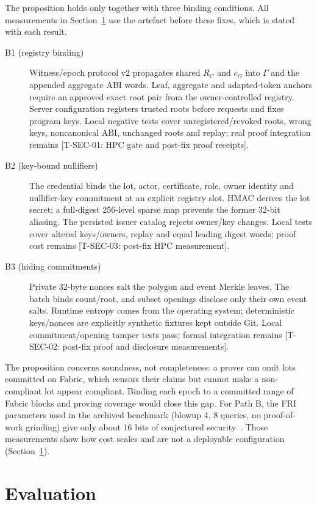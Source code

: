 \documentclass[runningheads]{llncs}
\newif\iffinal
\newcommand{\pending}[2]{\iffinal\errmessage{Unresolved pending result #1}\else{\color{red}[#1: #2]}\fi}
\newif\ifmarkrev
\newcommand{\rev}[1]{\ifmarkrev{\color{blue}#1}\else#1\fi}
\newcommand{\cG}{c_{G}}
\newcommand{\RC}{R_{C}}
\begin{document}
The proposition holds only together with three binding conditions. \rev{All measurements in Section~\ref{sec:eval} use the artefact before these fixes, which is stated with each result.}
\begin{description}
\item[B1 (registry binding)] Witness/epoch protocol v2 propagates shared $\RC$ and $\cG$ into $\Gamma$ and the appended aggregate ABI words. Leaf, aggregate and adapted-token anchors require an approved exact root pair from the owner-controlled registry. Server configuration registers trusted roots before requests and fixes program keys. Local negative tests cover unregistered/revoked roots, wrong keys, noncanonical ABI, unchanged roots and replay; real proof integration remains \pending{T-SEC-01}{HPC gate and post-fix proof receipts}.
\item[B2 (key-bound nullifiers)] The credential binds the lot, actor, certificate, role, owner identity and nullifier-key commitment at an explicit registry slot. HMAC derives the lot secret; a full-digest 256-level sparse map prevents the former 32-bit aliasing. The persisted issuer catalog rejects owner/key changes. Local tests cover altered keys/owners, replay and equal leading digest words; proof cost remains \pending{T-SEC-03}{post-fix HPC measurement}.
\item[B3 (hiding commitments)] Private 32-byte nonces salt the polygon and event Merkle leaves. The batch binds count/root, and subset openings disclose only their own event salts. Runtime entropy comes from the operating system; deterministic keys/nonces are explicitly synthetic fixtures kept outside Git. Local commitment/opening tamper tests pass; formal integration remains \pending{T-SEC-02}{post-fix proof and disclosure measurements}.
\end{description}
\rev{The proposition concerns soundness, not completeness: a prover can omit lots committed on Fabric, which censors their claims but cannot make a non-compliant lot appear compliant. Binding each epoch to a committed range of Fabric blocks and proving coverage would close this gap.} For Path B, the FRI parameters used in the archived benchmark (blowup 4, 8 queries, no proof-of-work grinding) give only about 16 bits of conjectured security~\cite{bensasson2018fri}. Those measurements show how cost scales and are not a deployable configuration (Section~\ref{sec:eval}).

\section{Evaluation}
\label{sec:eval}
\end{document}
